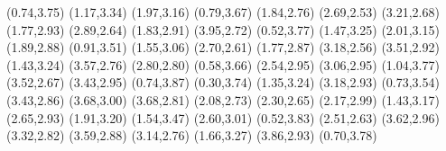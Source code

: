 \psdot[](0.74,3.75)
\psdot[](1.17,3.34)
\psdot[](1.97,3.16)
\psdot[](0.79,3.67)
\psdot[](1.84,2.76)
\psdot[](2.69,2.53)
\psdot[](3.21,2.68)
\psdot[](1.77,2.93)
\psdot[](2.89,2.64)
\psdot[](1.83,2.91)
\psdot[](3.95,2.72)
\psdot[](0.52,3.77)
\psdot[](1.47,3.25)
\psdot[](2.01,3.15)
\psdot[](1.89,2.88)
\psdot[](0.91,3.51)
\psdot[](1.55,3.06)
\psdot[](2.70,2.61)
\psdot[](1.77,2.87)
\psdot[](3.18,2.56)
\psdot[](3.51,2.92)
\psdot[](1.43,3.24)
\psdot[](3.57,2.76)
\psdot[](2.80,2.80)
\psdot[](0.58,3.66)
\psdot[](2.54,2.95)
\psdot[](3.06,2.95)
\psdot[](1.04,3.77)
\psdot[](3.52,2.67)
\psdot[](3.43,2.95)
\psdot[](0.74,3.87)
\psdot[](0.30,3.74)
\psdot[](1.35,3.24)
\psdot[](3.18,2.93)
\psdot[](0.73,3.54)
\psdot[](3.43,2.86)
\psdot[](3.68,3.00)
\psdot[](3.68,2.81)
\psdot[](2.08,2.73)
\psdot[](2.30,2.65)
\psdot[](2.17,2.99)
\psdot[](1.43,3.17)
\psdot[](2.65,2.93)
\psdot[](1.91,3.20)
\psdot[](1.54,3.47)
\psdot[](2.60,3.01)
\psdot[](0.52,3.83)
\psdot[](2.51,2.63)
\psdot[](3.62,2.96)
\psdot[](3.32,2.82)
\psdot[](3.59,2.88)
\psdot[](3.14,2.76)
\psdot[](1.66,3.27)
\psdot[](3.86,2.93)
\psdot[](0.70,3.78)

